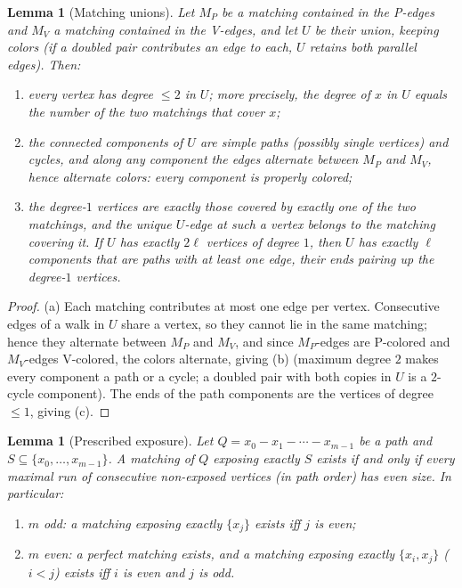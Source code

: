 \documentclass[11pt]{article}
\newtheorem{lemma}[theorem]{Lemma}
\theoremstyle{definition}
\begin{document}
\begin{lemma}[Matching unions]\label{lem:munion}
Let $M_P$ be a matching contained in the P-edges and $M_V$ a matching contained in the
V-edges, and let $U$ be their union, keeping colors (if a doubled pair contributes an
edge to each, $U$ retains both parallel edges). Then:
\begin{enumerate}
\item[(a)] every vertex has degree $\le 2$ in $U$; more precisely, the degree of $x$
in $U$ equals the number of the two matchings that cover $x$;
\item[(b)] the connected components of $U$ are simple paths (possibly single vertices)
and cycles, and along any component the edges alternate between $M_P$ and $M_V$, hence
alternate colors: every component is properly colored;
\item[(c)] the degree-$1$ vertices are exactly those covered by exactly one of the two
matchings, and the unique $U$-edge at such a vertex belongs to the matching covering
it. If $U$ has exactly $2\ell$ vertices of degree $1$, then $U$ has exactly $\ell$
components that are paths with at least one edge, their ends pairing up the degree-$1$
vertices.
\end{enumerate}
\end{lemma}

\begin{proof}
(a) Each matching contributes at most one edge per vertex. Consecutive edges of a walk
in $U$ share a vertex, so they cannot lie in the same matching; hence they alternate
between $M_P$ and $M_V$, and since $M_P$-edges are P-colored and $M_V$-edges V-colored,
the colors alternate, giving (b) (maximum degree $2$ makes every component a path or a
cycle; a doubled pair with both copies in $U$ is a $2$-cycle component). The ends of the
path components are the vertices of degree $\le 1$, giving (c).
\end{proof}

\begin{lemma}[Prescribed exposure]\label{lem:expose}
Let $Q = x_0 - x_1 - \cdots - x_{m-1}$ be a path and $S \subseteq \{x_0,\dots,x_{m-1}\}$.
A matching of $Q$ exposing exactly $S$ exists if and only if every maximal run of
consecutive non-exposed vertices (in path order) has even size. In particular:
\begin{enumerate}
\item[(a)] $m$ odd: a matching exposing exactly $\{x_j\}$ exists iff $j$ is even;
\item[(b)] $m$ even: a perfect matching exists, and a matching exposing exactly
$\{x_i, x_j\}$ ($i < j$) exists iff $i$ is even and $j$ is odd.
\end{enumerate}
\end{lemma}
\end{document}
